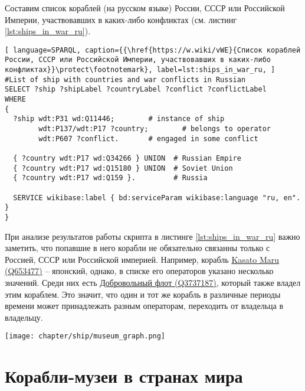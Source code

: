 Составим список кораблей (на русском языке) России, СССР или Российской Империи, участвовавших в каких-либо конфликтах (см. листинг \ref{lst:ships_in_war_ru}).

\begin{lstlisting}[ language=SPARQL, caption={{\href{https://w.wiki/vWE}{Список кораблей России, СССР или Российской Империи, участвовавших в каких-либо конфликтах}}\protect\footnotemark}, label=lst:ships_in_war_ru, ]
#List of ship with countries and war conflicts in Russian
SELECT ?ship ?shipLabel ?countryLabel ?conflict ?conflictLabel
WHERE
{
  ?ship wdt:P31 wd:Q11446;        # instance of ship
        wdt:P137/wdt:P17 ?country;        # belongs to operator
        wdt:P607 ?conflict.       # engaged in some conflict
  
  { ?country wdt:P17 wd:Q34266 } UNION  # Russian Empire
  { ?country wdt:P17 wd:Q15180 } UNION  # Soviet Union
  { ?country wdt:P17 wd:Q159 }.         # Russia

  SERVICE wikibase:label { bd:serviceParam wikibase:language "ru, en". }
}
\end{lstlisting}

При анализе результатов работы скрипта в листинге \ref{lst:ships_in_war_ru} важно заметить, что попавшие в него корабли не обязательно связанны только с Россией, СССР или Российской империей. Например, корабль \href{https://www.wikidata.org/wiki/Q653477}{Kasato Maru (Q653477)} -- японский, однако, в списке его операторов указано несколько значений. Среди них есть \href{https://www.wikidata.org/wiki/Q3737187}{Добровольный флот (Q3737187)}, который также владел этим кораблем. Это значит, что один и тот же корабль в различные периоды времени может принадлежать разным операторам, переходить от владельца в владельцу.



  
\begin{figure*}[ht]
  \texttt{[image: chapter/ship/museum\_graph.png]}
  \caption[Граф стран и кораблей-музеев]{Фрагмент графа стран, кораблей-музеев и конфликтов, построенный по скрипту в листинге \ref{lst:museum_graph}.}%
  \label{fig:museum_graph}%
\end{figure*}
\section{Корабли-музеи в странах мира}

